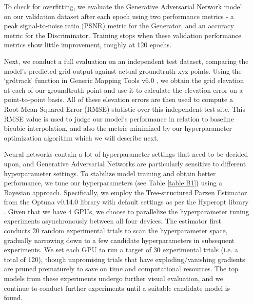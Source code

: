\documentclass[tc, manuscript]{copernicus}
\begin{document}
To check for overfitting, we evaluate the Generative Adversarial Network model on our validation dataset after each epoch using two performance metrics - a peak signal-to-noise ratio (PSNR) metric for the Generator, and an accuracy metric for the Discriminator.
Training stops when these validation performance metrics show little improvement, roughly at 120 epochs.

Next, we conduct a full evaluation on an independent test dataset, comparing the model's predicted grid output against actual groundtruth xyz points.
Using the `grdtrack' function in Generic Mapping Tools v6.0 \citep{WesselGenericMappingTools2019}, we obtain the grid elevation at each of our groundtruth point and use it to calculate the elevation error on a point-to-point basis.
All of these elevation errors are then used to compute a Root Mean Squared Error (RMSE) statistic over this independent test site.
This RMSE value is used to judge our model's performance in relation to baseline bicubic interpolation, and also the metric minimized by our hyperparameter optimization algorithm which we will describe next.

Neural networks contain a lot of hyperparameter settings that need to be decided upon, and Generative Adversarial Networks are particularly sensitive to different hyperparameter settings.
To stabilize model training and obtain better performance, we tune our hyperparameters (see Table \ref{table:B1}) using a Bayesian approach.
Specifically, we employ the Tree-structured Parzen Estimator \citep{BergstraAlgorithmsHyperparameterOptimization2011} from the Optuna v0.14.0 \citep{AkibaOptunaNextgenerationHyperparameter2019} library with default settings as per the Hyperopt library \citep{BergstraHyperoptPythonlibrary2015}.
Given that we have 4 GPUs, we choose to parallelize the hyperparameter tuning experiments asynchronously between all four devices.
The estimator first conducts 20 random experimental trials to scan the hyperparameter space, gradually narrowing down to a few candidate hyperparameters in subsequent experiments.
We set each GPU to run a target of 30 experimental trials (i.e. a total of 120), though unpromising trials that have exploding/vanishing gradients are pruned prematurely to save on time and computational resources.
The top models from these experiments undergo further visual evaluation, and we continue to conduct further experiments until a suitable candidate model is found.

\noappendix       %
\end{document}
